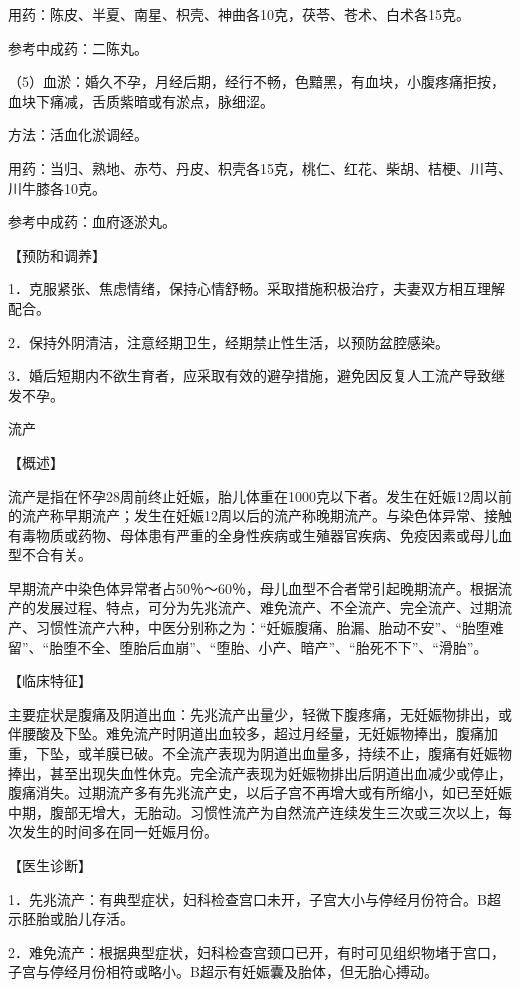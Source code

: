\documentclass[12pt,UTF8]{ctexbook}
\begin{document}
用药：陈皮、半夏、南星、枳壳、神曲各10克，茯苓、苍术、白术各15克。

参考中成药：二陈丸。

（5）血淤：婚久不孕，月经后期，经行不畅，色黯黑，有血块，小腹疼痛拒按，血块下痛减，舌质紫暗或有淤点，脉细涩。

方法：活血化淤调经。

用药：当归、熟地、赤芍、丹皮、枳壳各15克，桃仁、红花、柴胡、桔梗、川芎、川牛膝各10克。

参考中成药：血府逐淤丸。

【预防和调养】

1．克服紧张、焦虑情绪，保持心情舒畅。采取措施积极治疗，夫妻双方相互理解配合。

2．保持外阴清洁，注意经期卫生，经期禁止性生活，以预防盆腔感染。

3．婚后短期内不欲生育者，应采取有效的避孕措施，避免因反复人工流产导致继发不孕。





流产


【概述】

流产是指在怀孕28周前终止妊娠，胎儿体重在1000克以下者。发生在妊娠12周以前的流产称早期流产；发生在妊娠12周以后的流产称晚期流产。与染色体异常、接触有毒物质或药物、母体患有严重的全身性疾病或生殖器官疾病、免疫因素或母儿血型不合有关。

早期流产中染色体异常者占50％～60％，母儿血型不合者常引起晚期流产。根据流产的发展过程、特点，可分为先兆流产、难免流产、不全流产、完全流产、过期流产、习惯性流产六种，中医分别称之为：“妊娠腹痛、胎漏、胎动不安”、“胎堕难留”、“胎堕不全、堕胎后血崩”、“堕胎、小产、暗产”、“胎死不下”、“滑胎”。

【临床特征】

主要症状是腹痛及阴道出血：先兆流产出量少，轻微下腹疼痛，无妊娠物排出，或伴腰酸及下坠。难免流产时阴道出血较多，超过月经量，无妊娠物捧出，腹痛加重，下坠，或羊膜已破。不全流产表现为阴道出血量多，持续不止，腹痛有妊娠物捧出，甚至出现失血性休克。完全流产表现为妊娠物排出后阴道出血减少或停止，腹痛消失。过期流产多有先兆流产史，以后子宫不再增大或有所缩小，如已至妊娠中期，腹部无增大，无胎动。习惯性流产为自然流产连续发生三次或三次以上，每次发生的时间多在同一妊娠月份。

【医生诊断】

1．先兆流产：有典型症状，妇科检查宫口未开，子宫大小与停经月份符合。B超示胚胎或胎儿存活。

2．难免流产：根据典型症状，妇科检查宫颈口已开，有时可见组织物堵于宫口，子宫与停经月份相符或略小。B超示有妊娠囊及胎体，但无胎心搏动。
\end{document}
